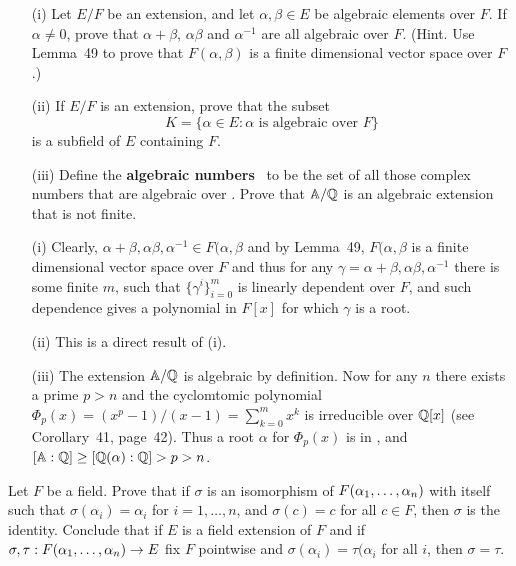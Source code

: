 \begin{myenumerate}

\item
\begin{excopy}
\begin{itemize}
 \item[(i)]
   Let \(E/F\) be an extension, and let \(\alpha, \beta\in E\) be algebraic
   elements over $F$.
   If \(\alpha \neq 0\), prove that \(\alpha+\beta\), \(\alpha\beta\)
   and \(\alpha^{-1}\) are all algebraic over $F$.
   (Hint. Use Lemma~49 to prove that \(F(\alpha,\beta)\)
   is a finite dimensional vector space over $F$.)
 \item[(ii)]
   If \(E/F\) is an extension, prove that the subset
   \[K = \{\alpha \in E:\alpha \textrm{\ is algebraic over\ } F\}\]
   is a subfield of $E$ containing $F$.
 \item[(iii)]
   Define the
   \textbf{algebraic numbers} \A\ to be the set of
   all those complex numbers that are algebraic over \Q.
   Prove that \(\mathbb{A}/\mathbb{Q}\) is an algebraic extension that is not finite.

\end{itemize}
\end{excopy}

\begin{itemize}
 \item[(i)]
  Clearly, \(\alpha+\beta, \alpha\beta,\alpha^{-1}\in F(\alpha,\beta\)
  and by Lemma~49, \(F(\alpha,\beta\) is a finite dimensional vector space
  over $F$ and thus for any \(\gamma = \alpha+\beta, \alpha\beta,\alpha^{-1}\)
  there is some finite $m$, such that
   \(\{\gamma^i\}_{i=0}^m\) is linearly dependent
  over $F$, and such dependence gives a polynomial in \(F[x]\) for
  which \(\gamma\) is a root.
 \item[(ii)]
  This is a direct result of (i).
 \item[(iii)]
  The extension \(\mathbb{A}/\mathbb{Q}\) is algebraic by definition.
  Now for any $n$ there exists a prime \(p>n\) and
  the
  cyclomtomic polynomial
   \(\Phi_p(x) = (x^p-1)/(x-1) = \sum_{k=0}^m x^k\)
  is irreducible over \(\mathbb{Q}[x]\)
  (see \cite{Rotman98} Corollary~41, page~42).
  Thus a root \(\alpha\) for \(\Phi_p(x)\) is in \A, and
  \([\mathbb{A}:\mathbb{Q}] \geq [\mathbb{Q}(\alpha):\mathbb{Q}] > p > n\).
\end{itemize}

\item
\begin{excopy}
Let $F$ be a field. Prove that if \(\sigma\) is an isomorphism of
\(F(\alpha_1,\ldots,\alpha_{n})\) with itself such that
\(\sigma(\alpha_i)=\alpha_i\) for \(i=1,\ldots,n\), and
\(\sigma(c)=c\) for all \(c\in F\),
then \(\sigma\) is the identity. Conclude that if $E$ is a field
extension of $F$ and if
\(\sigma,\tau: F(\alpha_1,\ldots,\alpha_{n}) \rightarrow E\) fix $F$ pointwise
and \(\sigma(\alpha_i)=\tau(\alpha_i\) for all $i$,
then \(\sigma=\tau\).
\end{excopy}


\end{myenumerate}
